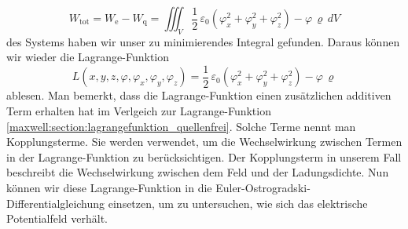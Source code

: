 \[
W_{\text{tot}}
=
W_{\text{e}} - W_{\text{q}}
=
\iiint_V \frac{1}{2}\,\varepsilon_0\left(\varphi_x^2 + \varphi_y^2 + \varphi_z^2\right) - \varphi\,\varrho\, dV
\]
des Systems haben wir unser zu minimierendes Integral gefunden.
Daraus können wir wieder die Lagrange-Funktion
\begin{equation}
L(x,y,z,\varphi,\varphi_x,\varphi_y,\varphi_z)
=
\frac{1}{2}\,\varepsilon_0\left(\varphi_x^2 + \varphi_y^2 + \varphi_z^2\right) - \varphi\,\varrho
\label{maxwell:section:lagrangefunktion_mit_quelle}
\end{equation}
ablesen.
Man bemerkt, dass die Lagrange-Funktion einen zusätzlichen additiven Term erhalten hat im Verlgeich zur Lagrange-Funktion \eqref{maxwell:section:lagrangefunktion_quellenfrei}.
Solche Terme nennt man Kopplungsterme.
Sie werden verwendet, um die Wechselwirkung zwischen Termen in der Lagrange-Funktion zu berücksichtigen.
Der Kopplungsterm in unserem Fall beschreibt die Wechselwirkung zwischen dem Feld und der Ladungsdichte.
Nun können wir diese Lagrange-Funktion in die Euler-Ostrogradski-Differentialgleichung einsetzen, um zu untersuchen, wie sich das elektrische Potentialfeld verhält.

